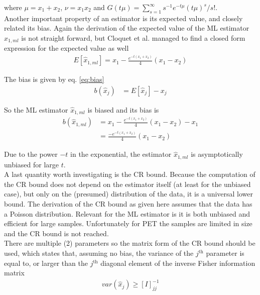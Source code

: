 \documentclass[report,12pt]{report}
\newcommand{\superscript}[1]{\ensuremath{^{\textrm{#1}}}}
\begin{document}
where $\mu = x_1 + x_2$, $\nu = x_1 x_2$ and $G(t\mu) = \sum_{s=1}^{\infty} s^{-1} e^{-t\mu} (t\mu)^{s} / s!$.\\

Another important property of an estimator is its expected value, and closely related its bias. Again the derivation of the expected value of the ML estimator $\hat x_{1, ml}$ is not straight forward, but Cloquet et al. \cite{MLEM and OSEM Deviate} managed to find a closed form expression for the expected value as well
\begin{align}
	E[\hat x_{1,ml}] = x_1 - \frac{e^{-t(x_1 + x_2)}}{4} 
	(x_1 - x_2)
	\label{eq:expectedValueML}
\end{align}

The bias is given by eq. \ref{eq:bias}
\begin{align}
	b(\hat x_j) &= E[\hat x_j] - x_{j}
\end{align}

So the ML estimator $\hat x_{1, ml}$ is biased and its bias is
\begin{align}
	b(\hat x_{1, ml}) 
	&=  x_1 - \frac{e^{-t(x_1 + x_2)}}{4} 
	(x_1 - x_2) - x_1
	\nonumber\\
	&= \frac{-e^{-t(x_1 + x_2)}}{4} 
	(x_1 - x_2)
	\label{eq:biasML}
\end{align}

Due to the power $-t$ in the exponential, the estimator $\hat x_{1, ml}$ is asymptotically unbiased for large $t$.\\

A last quantity worth investigating is the CR bound. Because the computation of the CR bound does not depend on the estimator itself (at least for the unbiased case), but only on the (presumed) distribution of the data, it is a universal lower bound. The derivation of the CR bound as given here assumes that the data has a Poisson distribution. Relevant for the ML estimator is it is both unbiased and efficient for large samples. Unfortunately for PET the samples are limited in size and the CR bound is not reached.\\

There are multiple (2) parameters so the matrix form of the CR bound should be used, which states that, assuming no bias, the variance of the $j$\superscript{th} parameter is equal to, or larger than the $j$\superscript{th} diagonal element of the inverse Fisher information matrix
\begin{align}
	var(\hat x_j) 
	\geq [I]^{-1}_{jj}
\end{align}
\end{document}
